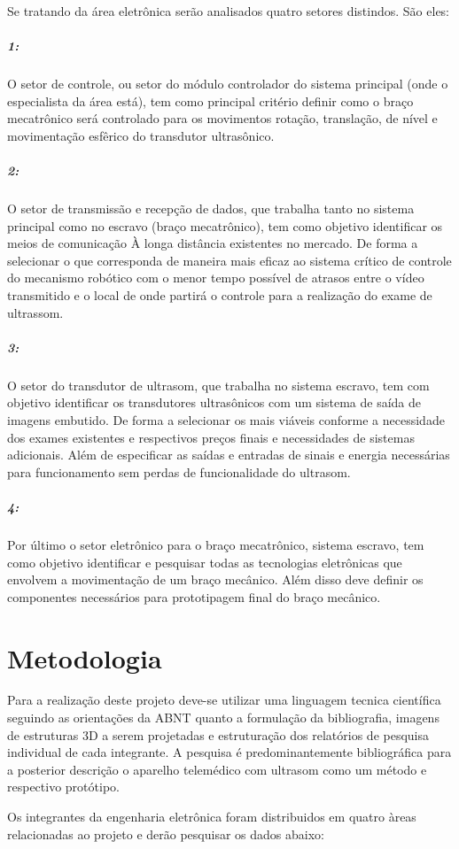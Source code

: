 \documentclass[a4paper]{article}
\begin{document}
Se tratando da área eletrônica serão analisados quatro setores distindos. São eles:

\subparagraph{1:}O setor de controle, ou setor do módulo controlador do sistema principal (onde o especialista da área está), tem como principal critério definir como o braço mecatrônico será controlado para os movimentos rotação, translação, de nível e movimentação esfêrico do transdutor ultrasônico. 

\subparagraph{2:}O setor de transmissão e recepção de dados, que trabalha tanto no sistema principal como no escravo (braço mecatrônico), tem como objetivo identificar os meios de comunicação À longa distância existentes no mercado. De forma a selecionar o que corresponda de maneira mais eficaz ao sistema crítico de controle do mecanismo robótico com o menor tempo possível de atrasos entre o vídeo transmitido e o local de onde partirá o controle para a realização do exame de ultrassom. 

\subparagraph{3:}O setor do transdutor de ultrasom, que trabalha no sistema escravo, tem com objetivo identificar os transdutores ultrasônicos com um sistema de saída de imagens embutido. De forma a selecionar os mais viáveis conforme a necessidade dos exames existentes e respectivos preços finais e necessidades de sistemas adicionais. Além de especificar as saídas e entradas de sinais e energia necessárias para funcionamento sem perdas de funcionalidade do ultrasom.

\subparagraph{4:}Por último o setor eletrônico para o braço mecatrônico, sistema escravo, tem como objetivo identificar e pesquisar todas as tecnologias eletrônicas que envolvem a movimentação de um braço mecânico. Além disso deve 
definir os componentes necessários para prototipagem final do braço mecânico.

\section{Metodologia}

Para a realização deste projeto deve-se utilizar uma linguagem tecnica científica seguindo as orientações da ABNT quanto a formulação da bibliografia, imagens de estruturas 3D a serem projetadas e estruturação dos relatórios de pesquisa individual de cada integrante. A pesquisa é predominantemente bibliográfica para a posterior descrição o aparelho telemédico com ultrasom como um método e respectivo protótipo. 

Os integrantes da engenharia eletrônica foram distribuidos em quatro àreas relacionadas ao projeto e derão pesquisar os dados abaixo:
\end{document}
